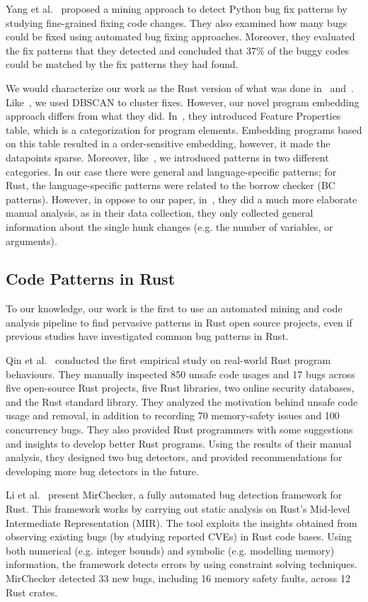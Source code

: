Yang et al.~\cite{yang2022mining} proposed a mining approach to detect Python bug fix patterns by studying fine-grained fixing code changes. They also examined how many bugs could be fixed using automated bug fixing approaches. Moreover, they evaluated the fix patterns that they detected and concluded that 37\% of the buggy codes could be matched by the fix patterns they had found. 

We would characterize our work as the Rust version of what was done in~\cite{hanam2016discovering} and~\cite{yang2022mining}. Like~\cite{hanam2016discovering}, we used DBSCAN to cluster fixes. However, our novel program embedding approach differs from what they did. In~\cite{hanam2016discovering}, they introduced Feature Properties table, which is a categorization for program elements. Embedding programs based on this table resulted in a order-sensitive embedding, however, it made the datapoints sparse. Moreover, like~\cite{yang2022mining}, we introduced patterns in two different categories. In our case there were general and language-specific patterns; for Rust, the language-specific patterns were related to the borrow checker (BC patterns). However, in oppose to our paper, in~\cite{yang2022mining}, they did a much more elaborate manual analysis, as in their data collection, they only collected general information about the single hunk changes (e.g. the number of variables, or arguments).

\subsection{Code Patterns in Rust}

To our knowledge, our work is the first to use an automated mining and code analysis pipeline to find pervasive patterns in Rust open source projects, even if previous studies have investigated common bug patterns in Rust.

Qin et al.~\cite{qin2020understanding} conducted the first empirical study on real-world Rust program behaviours. They manually inspected 850 unsafe code usages and 17 bugs across five open-source Rust projects, five Rust libraries, two online security databases, and the Rust standard library. They analyzed the motivation behind unsafe code usage and removal, in addition to recording 70 memory-safety issues and 100 concurrency bugs. They also provided Rust programmers with some suggestions and insights to develop better Rust programs. Using the results of their manual analysis, they designed two bug detectors, and provided recommendations for developing more bug detectors in the future.

Li et al.~\cite{li2021mirchecker} present MirChecker, a fully automated bug detection framework for Rust. This framework works by carrying out static analysis on Rust's Mid-level Intermediate Representation (MIR). The tool exploits the insights obtained from observing existing bugs (by studying reported CVEs) in Rust code bases. Using both numerical (e.g. integer bounds) and symbolic (e.g. modelling memory) information, the framework detects errors by using constraint solving techniques. MirChecker detected 33 new bugs, including 16 memory safety faults, across 12 Rust crates.

